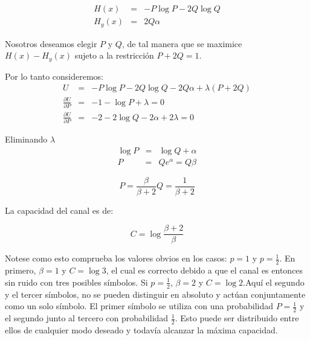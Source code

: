 \begin{equation}
\begin{array}{rcl}
H(x) &=& -P\log{P} - 2Q\log{Q} \\
H_y(x) &=& 2Q\alpha
\end{array}
\end{equation}

Nosotros deseamos elegir $P$ y $Q$, de tal manera que se maximice
$H(x) - H_y(x)$ sujeto a la restricci\'on $P + 2Q = 1$.

Por lo tanto consideremos:
\begingroup
\renewcommand*{\arraystretch}{2.0}
\begin{equation}
\begin{array}{rcl}
U &=& -P\log{P} - 2Q\log{Q} -2Q\alpha + \lambda(P+2Q) \\
\displaystyle\frac{{\partial U}}{{\partial P}} &=& -1 - \log{P} + \lambda = 0 \\
\displaystyle\frac{{\partial U}}{{\partial P}} &=& -2 - 2\log{Q} -2\alpha + 2\lambda = 0
\end{array}
\end{equation}
\endgroup

Eliminando $\lambda$
\begin{equation}
\begin{array}{rcl}
\log{P} &=& \log{Q} + \alpha \\
P &=& Q e^\alpha = Q\beta 
\end{array}
\end{equation}

\begin{equation}
  P = \frac{\beta}{\beta + 2}   Q = \frac{1}{\beta + 2}
\end{equation}

La capacidad del canal es de:

\begin{equation}
  C = \log{\frac{\beta + 2}{\beta}}
\end{equation}

Notese como esto comprueba los valores obvios en los casos: $p = 1$ y $p = \frac{1}{2}$. En primero, $\beta = 1$ y $C = \log{3}$, 
el cual es correcto debido a que el canal es entonces sin ruido con tres posibles s\'imbolos. Si $p = \frac{1}{2}$, $\beta = 2$ y 
$C = \log{2}$.Aqu\'i el segundo y el tercer s\'imbolos, no se pueden distinguir en absoluto y act\'uan conjuntamente como un solo 
s\'imbolo. El primer s\'imbolo se utiliza con una probabilidad $P = \frac{1}{2}$  y el segundo junto al tercero con probabilidad $\frac{1}{2}$.
Esto puede ser distribuido entre ellos de cualquier modo deseado y todav\'ia alcanzar la m\'axima capacidad.

